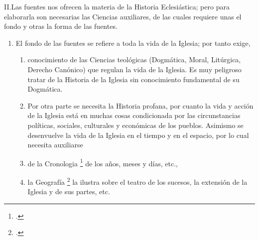 \raggedbottom{} \documentclass[12pt, a4paper, openany]{book} %
\begin{document}
II.\@ Las fuentes nos ofrecen la materia de la Historia Eclesiástica; pero para elaborarla son necesarias las Ciencias auxiliares, de las cuales requiere unas el fondo y otras la forma de las fuentes.
\begin{enumerate}
  \item El fondo de las fuentes se refiere a toda la vida de la Iglesia;
        por tanto exige,\begin{enumerate}
          \item conocimiento de las Ciencias teológicas (Dogmática, Moral, Litúrgica, Derecho Canónico) que regulan la vida de la Iglesia. Es muy peligroso tratar de la Historia de la Iglesia sin conocimiento fundamental de su Dogmática.
          \item Por otra parte se necesita la Historia profana, por cuanto la vida y acción de la Iglesia está en muchas cosas condicionada por las circunstancias políticas, sociales, culturales y económicas de los pueblos. Asimismo se desenvuelve la vida de la Iglesia en el tiempo y en el espacio, por lo cual necesita auxiliarse
          \item de la Cronologia \footcite{Petavius1703DeDoctrina} de los años, meses y días, etc.,
          \item la Geografía \footcite{Chevalier1894Topo} la ilustra sobre el teatro de los sucesos, la extensión de la Iglesia y de sus partes, etc.



\end{enumerate}
\end{enumerate}
\end{document}
